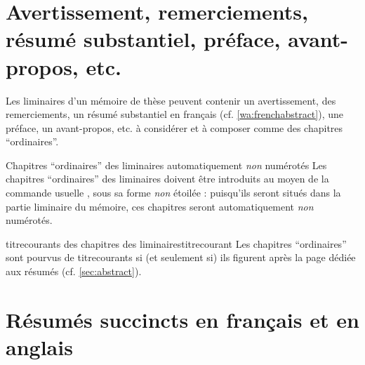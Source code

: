 \section{Avertissement, remerciements, résumé substantiel, préface,
  avant-propos, etc.}

Les \glspl{liminaire} d'un mémoire de thèse peuvent contenir un avertissement,
des remerciements, un résumé substantiel en français
(cf. \vref{wa:frenchabstract}), une préface, un avant-propos, etc.
à considérer et à composer comme des chapitres \enquote{ordinaires}.

\begin{dbwarning}{Chapitres \enquote{ordinaires} des \glspl{liminaire}
    automatiquement \emph{non} numérotés}{}
  Les chapitres \enquote{ordinaires} des \glspl{liminaire} doivent être
  introduits au moyen de la commande usuelle , sous sa
  forme \emph{non} étoilée : puisqu'ils seront situés dans la partie liminaire
  du mémoire, ces chapitres seront automatiquement \emph{non} numérotés.
\end{dbwarning}

\begin{dbremark}{\protect\Glspl{titrecourant} des chapitres des \protect\glspl{liminaire}}{titrecourant}
  Les chapitres \enquote{ordinaires} sont pourvus de \glspl{titrecourant} si
  (et seulement si) ils figurent après la page dédiée aux résumés
  (cf. \vref{sec:abstract}).
\end{dbremark}

\section{Résumés succincts en français et en anglais}\label{sec:abstract}

